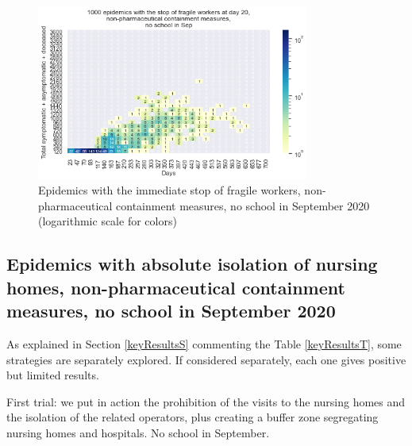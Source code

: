 \documentclass[graybox]{svmult}
\begin{document}
\begin{figure}[t]
\begin{center}
\includegraphics[width=0.8\textwidth]{HM30_readRunResults1k_with_sFW_at20_plusHMlog.png}
\caption{Epidemics with the immediate stop of fragile workers, non-pharmaceutical containment measures, no school in September 2020 (logarithmic scale for colors)}
\label{EpidemicsFWsHM}
\end{center}
\end{figure}


\subsection{Epidemics with absolute isolation of nursing homes, non-pharmaceutical containment measures, no school in September 2020}
\label{EpidemicsNHsS}

As explained in Section \ref{keyResultsS} commenting the Table \ref{keyResultsT}, some strategies are separately explored. If considered separately, each one gives positive but limited results. 

First trial: we put in action the prohibition of the visits to the nursing homes and the isolation of the related operators, plus creating a buffer zone segregating nursing homes and hospitals. No school in September.
\end{document}
